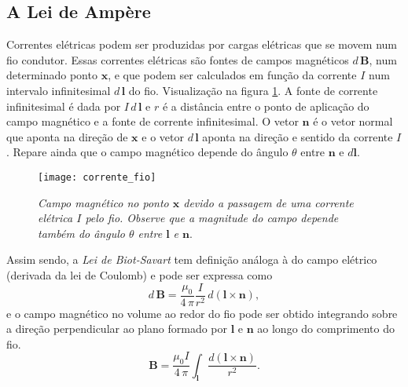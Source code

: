 \subsection{A Lei de Ampère}\label{sec.lei_ampere}
Correntes elétricas podem ser produzidas por cargas elétricas que se movem num fio condutor. Essas correntes elétricas são fontes de campos magnéticos $d\,\textbf{B}$, num determinado ponto $\mathbf{x}$, e que podem ser calculados em função da corrente $I$ num intervalo infinitesimal $d\,\textbf{l}$ do fio. Visualização na figura \ref{fig.corrente_fio}. A fonte de corrente infinitesimal é dada por $I\,d\,\textbf{l}$ e $r$ é a distância entre o ponto de aplicação do campo magnético e a fonte de corrente infinitesimal. O vetor $\textbf{n}$ é o vetor normal que aponta na direção de $\mathbf{x}$ e o vetor $d\,\textbf{l}$ aponta na direção e sentido da corrente $I$. Repare ainda que o campo magnético depende do ângulo $\theta$ entre $\mathbf{n}$ e $d\mathbf{l}$.
\begin{figure}
\centering
\texttt{[image: corrente\_fio]}
\caption{\textit{Campo magnético no ponto $\mathbf{x}$ devido a passagem de uma corrente elétrica $I$ pelo fio. Observe que a magnitude do campo depende também do ângulo $\theta$ entre $\textbf{l}$ e $\textbf{n}$}.}
\label{fig.corrente_fio}
\end{figure}
Assim sendo, a \textit{Lei de Biot-Savart} tem definição análoga à do campo elétrico (derivada da lei de Coulomb) e pode ser expressa como
\begin{equation}\label{eq.lei_biot_savart}
d\,\textbf{B}=\frac{\mu_0}{4\,\pi}\frac{I}{r^2}\,d(\textbf{l}\times\textbf{n}),
\end{equation}
e o campo magnético no volume ao redor do fio pode ser obtido integrando sobre a direção perpendicular ao plano formado por $\textbf{l}$ e $\textbf{n}$ ao longo do comprimento do fio.
\begin{equation}
\textbf{B}=\frac{\mu_0I}{4\,\pi}\int_{\textbf{l}}\frac{d(\textbf{l}\times\textbf{n})}{r^2}.
\end{equation}

